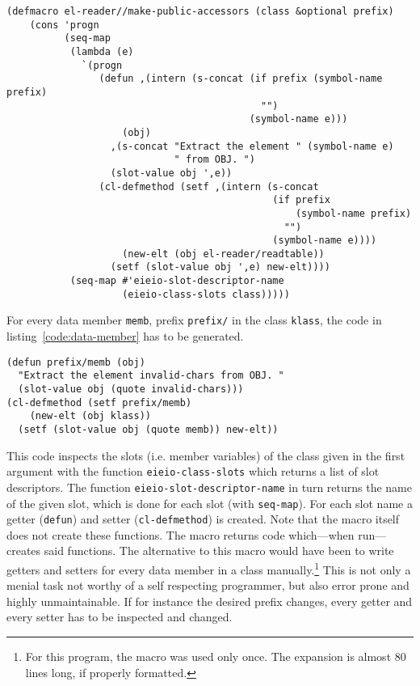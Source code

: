 \documentclass[a4paper,10pt,twoside]{report}
\newcommand{\sym}[1]{\texttt{#1}}
\newcommand{\fun}[1]{\texttt{#1}}
\begin{document}
\begin{lstlisting}[style=lispcode,caption={Create accessors for all data members
  of a given class.},label={code:make-accessors}]
(defmacro el-reader//make-public-accessors (class &optional prefix)
    (cons 'progn
          (seq-map
           (lambda (e)
             `(progn
                (defun ,(intern (s-concat (if prefix (symbol-name prefix)
                                            "")
                                          (symbol-name e)))
                    (obj)
                  ,(s-concat "Extract the element " (symbol-name e)
                             " from OBJ. ")
                  (slot-value obj ',e))
                (cl-defmethod (setf ,(intern (s-concat
                                              (if prefix
                                                  (symbol-name prefix)
                                                "")
                                              (symbol-name e))))
                    (new-elt (obj el-reader/readtable))
                  (setf (slot-value obj ',e) new-elt))))
           (seq-map #'eieio-slot-descriptor-name
                    (eieio-class-slots class)))))
\end{lstlisting}

For every data member \sym{memb}, prefix \sym{prefix/} in the class \sym{klass},
the code in listing~\ref{code:data-member} has to be generated.

\begin{lstlisting}[style=lispcode,caption={Getter and Setter for a member called
  \sym{memb}.},label={code:data-member}]
(defun prefix/memb (obj)
  "Extract the element invalid-chars from OBJ. "
  (slot-value obj (quote invalid-chars)))
(cl-defmethod (setf prefix/memb)
    (new-elt (obj klass))
  (setf (slot-value obj (quote memb)) new-elt))
\end{lstlisting}

This code inspects the slots (i.e. member variables) of the class given in the
first argument with the function \fun{eieio-class-slots} which returns a list of
slot descriptors.  The function \fun{eieio-slot-descriptor-name} in turn returns
the name of the given slot, which is done for each slot (with \fun{seq-map}).
For each slot name a getter (\fun{defun}) and setter (\fun{cl-defmethod}) is
created.  Note that the macro itself does not create these functions.  The macro
returns code which---when run---creates said functions.  The alternative to this
macro would have been to write getters and setters for every data member in a
class manually.\footnote{For this program, the macro was used only once.  The
  expansion is almost 80 lines long, if properly formatted.}  This is not only a
menial task not worthy of a self respecting programmer, but also error prone and
highly unmaintainable.  If for instance the desired prefix changes, every getter
and every setter has to be inspected and changed.
\end{document}
